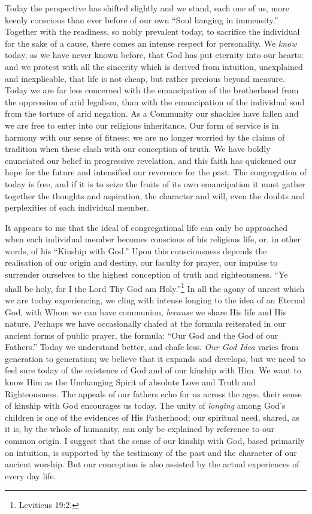 Today the perspective has shifted slightly and we
stand, each one of us, more keenly conscious than ever
before of our own ``Soul hanging in immensity.'' Together
with the readiness, so nobly prevalent today, to sacrifice
the individual for the sake of a cause, there comes an
intense respect for personality. We \textsl{know} today, as we have
never known before, that God has put eternity into our
hearts; and we protest with all the sincerity which is
derived from intuition, unexplained and inexplicable, that
life is not cheap, but rather precious beyond measure.
Today we are far less concerned with the emancipation of
the brotherhood from the oppression of arid legalism, than
with the emancipation of the individual soul from the
torture of arid negation. As a Community our shackles have
fallen and we are free to enter into our religious inheritance.
Our form of service is in harmony with our sense of
fitness; we are no longer worried by the claims of tradition
when these clash with our conception of truth. We
have boldly enunciated our belief in progressive revelation,
and this faith has quickened our hope for the future
and intensified our reverence for the past. The congregation
of today is free, and if it is to seize the fruits of
its own emancipation it must gather together the thoughts
and aspiration, the character and will, even the doubts and
perplexities of each individual member.

It appears to me that the ideal of congregational life
can only be approached when each individual member becomes
conscious of his religious life, or, in other words, of his
``Kinship with God.'' Upon this consciousness depends the
realisation of our origin and destiny, our faculty for
prayer, our impulse to surrender ourselves to the highest
conception of truth and righteousness. ``Ye shall be holy,
for I the Lord Thy God am Holy.''\footnote{Leviticus 19:2.} In all the agony of
unrest which we are today experiencing, we cling with
intense longing to the idea of an Eternal God, with Whom we
can have communion, \textsl{because} we share His life and His
nature. Perhaps we have occasionally chafed at the formula
reiterated in our ancient forms of public prayer, the
formula: ``Our God and the God of our Fathers.'' Today we
understand better, and chafe less. \textsl{Our God Idea} varies
from generation to generation; we believe that it expands
and develops, but we need to feel sure today of the existence
of God and of our kinship with Him. We want to know
Him as the Unchanging Spirit of absolute Love and Truth and
Righteousness. The appeals of our fathers echo for us
across the ages; their sense of kinship with God encourages
us today. The unity of \textsl{longing} among God's children is one
of the evidences of His Fatherhood; our spiritual need,
shared, as it is, by the whole of humanity, can only be
explained by reference to our common origin. I suggest that
the sense of our kinship with God, based primarily on
intuition, is supported by the testimony of the past and
the character of our ancient worship. But our conception
is also assisted by the actual experiences of every day
life.

